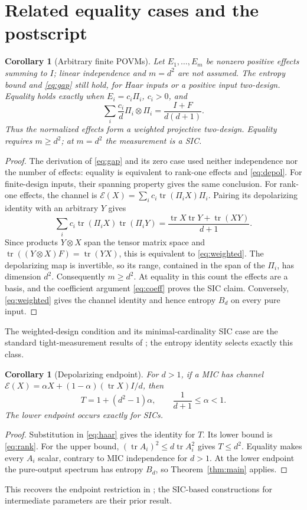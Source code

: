 \documentclass[11pt]{article}
\newtheorem{corollary}[theorem]{Corollary}
\newcommand{\tr}{\operatorname{tr}}
\newcommand{\Id}{I}
\newcommand{\cE}{\mathcal E}
\begin{document}
\section{Related equality cases and the postscript}

\begin{corollary}[Arbitrary finite POVMs]\label{cor:povm}
Let $E_1,\ldots,E_m$ be nonzero positive effects summing to $\Id$;
linear independence and $m=d^2$ are not assumed. The entropy bound and
\eqref{eq:gap} still hold, for Haar inputs or a positive input two-design.
Equality holds exactly when
$E_i=c_i\Pi_i$, $c_i>0$, and
\begin{equation}\label{eq:weighted}
 \sum_i\frac{c_i}{d}\Pi_i\otimes\Pi_i
   =\frac{\Id+F}{d(d+1)}.
\end{equation}
Thus the normalized effects form a weighted projective two-design.
Equality requires $m\geq d^2$; at $m=d^2$ the measurement is a SIC.
\end{corollary}
\begin{proof}
The derivation of \eqref{eq:gap} and its zero case used neither
independence nor the number of effects: equality is equivalent to
rank-one effects and \eqref{eq:depol}. For finite-design inputs, their
spanning property gives the same conclusion.
For rank-one effects, the channel is
$\cE(X)=\sum_i c_i\tr(\Pi_iX)\Pi_i$.
Pairing its depolarizing identity with an arbitrary $Y$ gives
\[
 \sum_i c_i\tr(\Pi_iX)\tr(\Pi_iY)
   =\frac{\tr X\tr Y+\tr(XY)}{d+1}.
\]
Since products $Y\otimes X$ span the tensor matrix space and
$\tr((Y\otimes X)F)=\tr(YX)$, this is equivalent to
\eqref{eq:weighted}. The depolarizing map is invertible, so its range,
contained in the span of the $\Pi_i$, has dimension $d^2$.
Consequently $m\geq d^2$. At equality in this count the effects are a
basis, and the coefficient argument \eqref{eq:coeff} proves the SIC claim.
Conversely, \eqref{eq:weighted} gives the channel identity and hence
entropy $B_d$ on every pure input.
\end{proof}
The weighted-design condition and its minimal-cardinality SIC case are
the standard tight-measurement results of \cite[Theorem 4 and Proposition 12]{Scott};
the entropy identity selects exactly this class.

\begin{corollary}[Depolarizing endpoint]\label{cor:alpha}
For $d>1$, if a MIC has channel
$\cE(X)=\alpha X+(1-\alpha)(\tr X)\Id/d$, then
\[
 T=1+(d^2-1)\alpha,\qquad \frac1{d+1}\leq\alpha<1.
\]
The lower endpoint occurs exactly for SICs.
\end{corollary}
\begin{proof}
Substitution in \eqref{eq:haar} gives the identity for $T$.
Its lower bound is \eqref{eq:rank}. For the upper bound,
$(\tr A_i)^2\leq d\tr A_i^2$ gives $T\leq d^2$.
Equality makes every $A_i$ scalar, contrary to MIC independence for
$d>1$. At the lower endpoint the pure-output spectrum has entropy
$B_d$, so Theorem~\ref{thm:main} applies.
\end{proof}
This recovers the endpoint restriction in \cite[Section II]{DS}; the
SIC-based constructions for intermediate parameters are their prior result.
\end{document}
